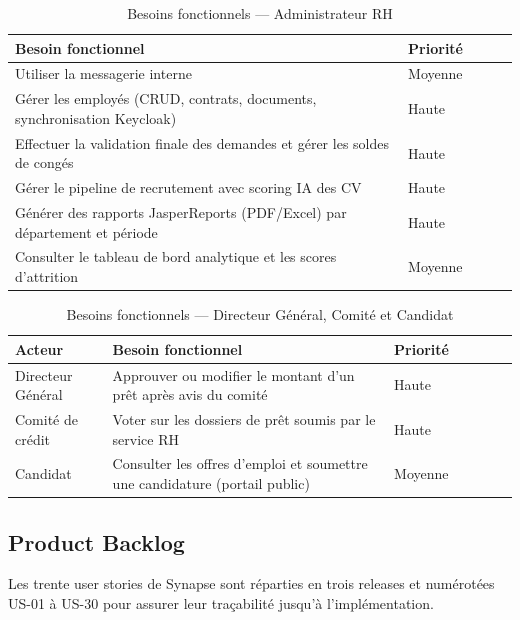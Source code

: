 \begin{table}[H]
\centering
\caption{Besoins fonctionnels — Administrateur RH}
\label{tab:bf_adminrh}
\begin{tabularx}{\textwidth}{VLVlV}
\hline
\textbf{Besoin fonctionnel} & \textbf{Priorité} \\
\hline
Utiliser la messagerie interne & Moyenne \\
\hline
Gérer les employés (CRUD, contrats, documents, synchronisation Keycloak) & Haute \\
\hline
Effectuer la validation finale des demandes et gérer les soldes de congés & Haute \\
\hline
Gérer le pipeline de recrutement avec scoring IA des CV & Haute \\
\hline
Générer des rapports JasperReports (PDF/Excel) par département et période & Haute \\
\hline
Consulter le tableau de bord analytique et les scores d’attrition & Moyenne \\
\hline
\end{tabularx}
\end{table}

\begin{table}[H]
\centering
\caption{Besoins fonctionnels — Directeur Général, Comité et Candidat}
\label{tab:bf_autres}
\begin{tabularx}{\textwidth}{VlVLVlV}
\hline
\textbf{Acteur} & \textbf{Besoin fonctionnel} & \textbf{Priorité} \\
\hline
Directeur Général & Approuver ou modifier le montant d’un prêt après avis du comité & Haute \\
\hline
Comité de crédit & Voter sur les dossiers de prêt soumis par le service RH & Haute \\
\hline
Candidat & Consulter les offres d’emploi et soumettre une candidature (portail public) & Moyenne \\
\hline
\end{tabularx}
\end{table}

\subsection{Product Backlog}

Les trente user stories de Synapse sont réparties en trois releases et numérotées
US-01 à US-30 pour assurer leur traçabilité jusqu’à l’implémentation.

